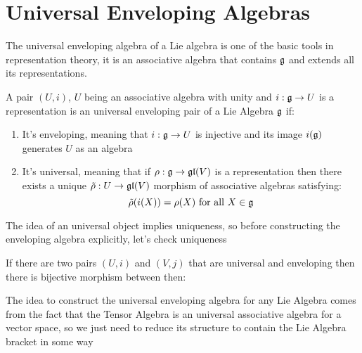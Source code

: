 \section{Universal Enveloping Algebras}
The universal enveloping algebra of a Lie algebra is one of the basic tools in representation theory, it is an associative algebra that contains $\mathfrak{g}$ and extends all its representations.
\begin{defi}
	A pair $(U,i)$, $U$ being an associative algebra with unity and $i:\mathfrak{g} \rightarrow U$ is a representation is
	 an universal enveloping pair of a Lie Algebra $\mathfrak{g}$ if:
	\begin{enumerate}
		\item It's enveloping, meaning that $i:\mathfrak{g} \rightarrow U$ is injective and its image $i(\mathfrak{g})$ generates $U$ as an algebra
		\item It's universal, meaning that if $\rho:\mathfrak{g} \rightarrow \mathfrak{gl}(V)$ is a representation then there exists a unique $\tilde{\rho}:U \rightarrow \mathfrak{gl}(V)$ morphism of associative algebras satisfying:
		$$ \tilde{\rho}(i(X)) = \rho(X) \text{ for all }X \in \mathfrak{g}$$
	\end{enumerate}
	\begin{center}
	\end{center}
	\label{41UniversalDef}
\end{defi}
The idea of an universal object implies uniqueness, so before constructing the enveloping algebra explicitly, let's check uniqueness
\begin{remark}
	If there are two pairs $(U,i)$ and $(V,j)$ that are universal and enveloping then there is bijective morphism between then:
\end{remark}
\begin{center}
\end{center}
The idea to construct the universal enveloping algebra for any Lie Algebra comes from the fact that the Tensor Algebra is an universal associative algebra for a vector space, so we just need to reduce its structure to contain the Lie Algebra bracket in some way
